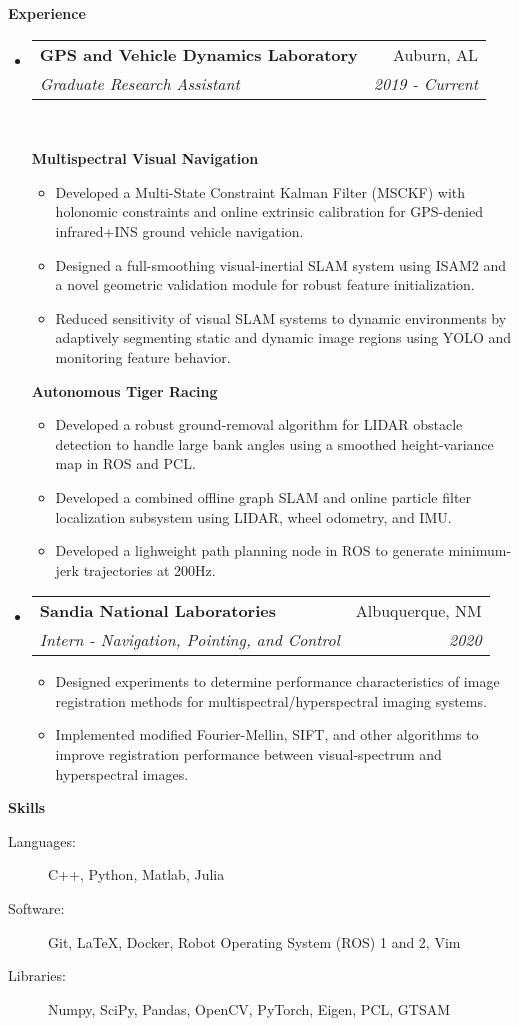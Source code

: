 \documentclass[letterpaper,11pt]{article}
\makeatletter
\newcommand{\resitem}[1]{\item #1 \vspace{-2pt}}
\newcommand{\resheading}[1]{\vspace{10pt} \Large \textbf{#1} \normalsize}
\newcommand{\ressubheading}[4]{
\begin{tabular*}{6.5in}{l@{\extracolsep{\fill}}r}
		\large \textbf{#1} \normalsize & #2 \\
		\textit{#3} & \textit{#4} \\
\end{tabular*}\vspace{-5pt}}
\makeatother
\begin{document}
\resheading{Experience}
\begin{itemize}

\item
	\ressubheading{GPS and Vehicle Dynamics Laboratory}{Auburn, AL}{Graduate Research Assistant}{2019 - Current}\\
	\vspace{10pt}

	\large \textbf{Multispectral Visual Navigation} \normalsize
	\vspace{-5pt}
	\begin{itemize}
		\resitem{Developed a Multi-State Constraint Kalman Filter (MSCKF) with holonomic constraints and online extrinsic calibration for GPS-denied infrared+INS ground vehicle navigation.}
		\resitem{Designed a full-smoothing visual-inertial SLAM system using ISAM2 and a novel geometric validation module for robust feature initialization.}
		\resitem{Reduced sensitivity of visual SLAM systems to dynamic environments by adaptively segmenting static and dynamic image regions using YOLO and monitoring feature behavior.}
	\end{itemize}

	\large \textbf{Autonomous Tiger Racing} \normalsize
	\vspace{-5pt}
	\begin{itemize}
		\resitem{Developed a robust ground-removal algorithm for LIDAR obstacle detection to handle large bank angles using a smoothed height-variance map in ROS and PCL.}
		\resitem{Developed a combined offline graph SLAM and online particle filter localization subsystem using LIDAR, wheel odometry, and IMU.}
		\resitem{Developed a lighweight path planning node in ROS to generate minimum-jerk trajectories at 200Hz.}
	\end{itemize}

\item
	\ressubheading{Sandia National Laboratories}{Albuquerque, NM}{Intern - Navigation, Pointing, and Control}{2020}
	\begin{itemize}
		\item Designed experiments to determine performance characteristics of image registration methods for multispectral/hyperspectral imaging systems.
		\item Implemented modified Fourier-Mellin, SIFT, and other algorithms to improve registration performance between visual-spectrum and hyperspectral images.
	\end{itemize}

\end{itemize}

\resheading{Skills}

\begin{description}
\item[Languages:]
C++, Python, Matlab, Julia
\item[Software:]
Git, \LaTeX, Docker, Robot Operating System (ROS) 1 and 2, Vim
\item[Libraries:]
Numpy, SciPy, Pandas, OpenCV, PyTorch, Eigen, PCL, GTSAM
\end{description}
\end{document}

